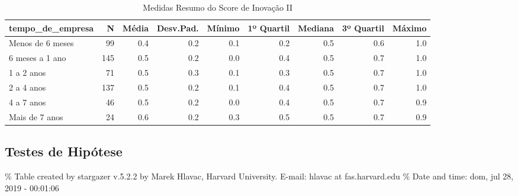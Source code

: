 \documentclass[]{book}
\begin{document}
\begin{table}[t]

\caption{\label{tab:unnamed-chunk-35}Medidas Resumo do Score de Inovação II}
\centering
\fontsize{7}{9}\selectfont
\begin{tabular}{lrrrrrrrr}
\toprule
tempo\_de\_empresa & N & Média & Desv.Pad. & Mínimo & 1º Quartil & Mediana & 3º Quartil & Máximo\\
\midrule
Menos de 6 meses & 99 & 0.4 & 0.2 & 0.1 & 0.2 & 0.5 & 0.6 & 1.0\\
6 meses a 1 ano & 145 & 0.5 & 0.2 & 0.0 & 0.4 & 0.5 & 0.7 & 1.0\\
1 a 2 anos & 71 & 0.5 & 0.3 & 0.1 & 0.3 & 0.5 & 0.7 & 1.0\\
2 a 4 anos & 137 & 0.5 & 0.2 & 0.1 & 0.4 & 0.5 & 0.7 & 1.0\\
4 a 7 anos & 46 & 0.5 & 0.2 & 0.0 & 0.4 & 0.5 & 0.7 & 0.9\\
\addlinespace
Mais de 7 anos & 24 & 0.6 & 0.2 & 0.3 & 0.5 & 0.5 & 0.7 & 0.9\\
\bottomrule
\end{tabular}
\end{table}

\pagebreak

\hypertarget{testes-de-hipotese-14}{%
\subsection{Testes de Hipótese}\label{testes-de-hipotese-14}}

\% Table created by stargazer v.5.2.2 by Marek Hlavac, Harvard University. E-mail: hlavac at fas.harvard.edu
\% Date and time: dom, jul 28, 2019 - 00:01:06
\end{document}

